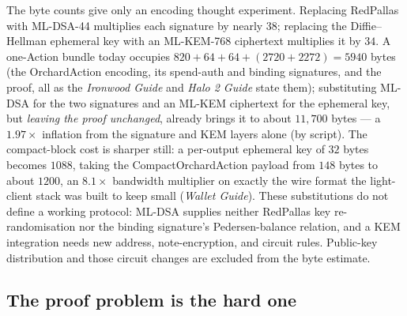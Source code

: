 \documentclass[11pt,a4paper]{article}
\theoremstyle{definition}
\begin{document}
The byte counts give only an encoding thought experiment. Replacing RedPallas with
ML-DSA-44 multiplies each signature by nearly $38$; replacing the
Diffie--Hellman ephemeral key with an ML-KEM-768 ciphertext multiplies
it by $34$. A one-Action bundle today occupies
$820 + 64 + 64 + (2720 + 2272) = 5940$ bytes (the OrchardAction
encoding, its spend-auth and binding signatures, and the proof, all as
the \emph{Ironwood Guide} and \emph{Halo 2 Guide} state them);
substituting ML-DSA for the two signatures and an ML-KEM ciphertext for
the ephemeral key, but \emph{leaving the proof unchanged}, already
brings it to about $11{,}700$ bytes --- a $1.97\times$ inflation from
the signature and KEM layers alone (by script). The compact-block cost
is sharper still: a per-output ephemeral key of $32$ bytes becomes
$1088$, taking the \textsf{CompactOrchardAction} payload from $148$
bytes to about $1200$, an $8.1\times$ bandwidth multiplier on exactly
the wire format the light-client stack was built to keep small
(\emph{Wallet Guide}). These substitutions do not define a working protocol:
ML-DSA supplies neither RedPallas key re-randomisation nor the binding
signature's Pedersen-balance relation, and a KEM integration needs new
address, note-encryption, and circuit rules. Public-key distribution and
those circuit changes are excluded from the byte estimate.

\subsection{The proof problem is the hard one}\label{sec:pq-proof}
\end{document}
